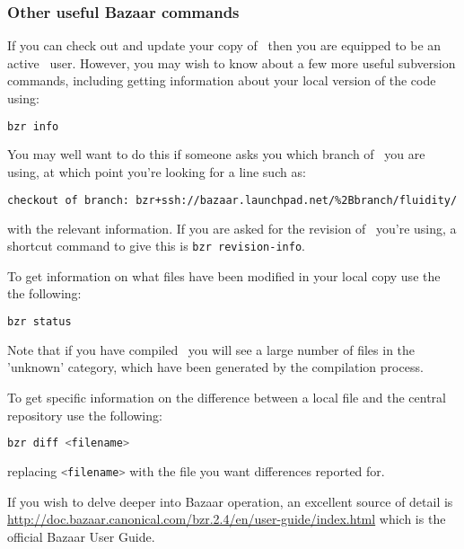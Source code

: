 \subsubsection{Other useful Bazaar commands}
\label{sec:subversion_extras}

If you can check out and update your copy of \fluidity\ then you are equipped to
be an active \fluidity\ user. However, you may wish to know about a few more
useful subversion commands, including getting information about your local
version of the code using:

\begin{lstlisting}[language=Bash]
bzr info
\end{lstlisting}

You may well want to do this if someone asks you which branch of \fluidity\ you
are using, at which point you're looking for a line such as:

\begin{lstlisting}[language=Bash]
checkout of branch: bzr+ssh://bazaar.launchpad.net/%2Bbranch/fluidity/
\end{lstlisting}

with the relevant information. If you are asked for the revision of
\fluidity\ you're using, a shortcut command to give this is
\lstinline[language=Bash]+bzr revision-info+.

To get information on what files have been modified in your
local copy use the the following:
\begin{lstlisting}[language=Bash]
bzr status
\end{lstlisting}

Note that if you have compiled \fluidity\ you will see a large number of files
in the 'unknown' category, which have been generated by the compilation
process. 

To get specific information on the difference between a local file and
the central repository use the following:
\begin{lstlisting}[language=Bash]
bzr diff <filename>
\end{lstlisting}

replacing \lstinline[language=Bash]+<filename>+ with the file you want
differences reported for.

If you wish to delve deeper into Bazaar operation, an excellent source of
detail is
\href{http://doc.bazaar.canonical.com/bzr.2.4/en/user-guide/index.html}
{http://doc.bazaar.canonical.com/bzr.2.4/en/user-guide/index.html}
which is the official Bazaar User Guide.

